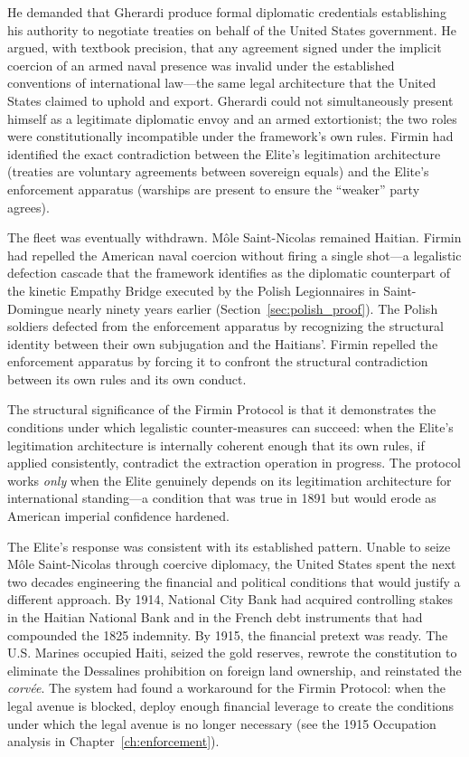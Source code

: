 He demanded that Gherardi produce formal diplomatic credentials establishing his authority to negotiate treaties on behalf of the United States government. He argued, with textbook precision, that any agreement signed under the implicit coercion of an armed naval presence was invalid under the established conventions of international law---the same legal architecture that the United States claimed to uphold and export. Gherardi could not simultaneously present himself as a legitimate diplomatic envoy and an armed extortionist; the two roles were constitutionally incompatible under the framework's own rules. Firmin had identified the exact contradiction between the Elite's legitimation architecture (treaties are voluntary agreements between sovereign equals) and the Elite's enforcement apparatus (warships are present to ensure the ``weaker'' party agrees).

The fleet was eventually withdrawn. Môle Saint-Nicolas remained Haitian. Firmin had repelled the American naval coercion without firing a single shot---a legalistic defection cascade that the framework identifies as the diplomatic counterpart of the kinetic Empathy Bridge executed by the Polish Legionnaires in Saint-Domingue nearly ninety years earlier (Section~\ref{sec:polish_proof}). The Polish soldiers defected from the enforcement apparatus by recognizing the structural identity between their own subjugation and the Haitians'. Firmin repelled the enforcement apparatus by forcing it to confront the structural contradiction between its own rules and its own conduct.

The structural significance of the Firmin Protocol is that it demonstrates the conditions under which legalistic counter-measures can succeed: when the Elite's legitimation architecture is internally coherent enough that its own rules, if applied consistently, contradict the extraction operation in progress. The protocol works \textit{only} when the Elite genuinely depends on its legitimation architecture for international standing---a condition that was true in 1891 but would erode as American imperial confidence hardened.

The Elite's response was consistent with its established pattern. Unable to seize Môle Saint-Nicolas through coercive diplomacy, the United States spent the next two decades engineering the financial and political conditions that would justify a different approach. By 1914, National City Bank had acquired controlling stakes in the Haitian National Bank and in the French debt instruments that had compounded the 1825 indemnity. By 1915, the financial pretext was ready. The U.S. Marines occupied Haiti, seized the gold reserves, rewrote the constitution to eliminate the Dessalines prohibition on foreign land ownership, and reinstated the \textit{corv\'{e}e}. The system had found a workaround for the Firmin Protocol: when the legal avenue is blocked, deploy enough financial leverage to create the conditions under which the legal avenue is no longer necessary (see the 1915 Occupation analysis in Chapter~\ref{ch:enforcement}).

